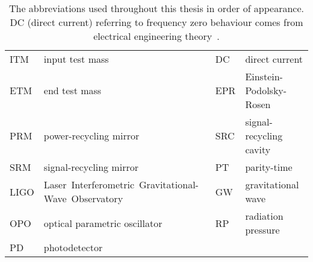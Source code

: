 \begin{table}[]
\centering
\begin{tabular}{@{}ll|ll@{}}
\toprule
ITM & input test mass & DC & direct current \\
ETM & end test mass & EPR & Einstein-Podolsky-Rosen \\
PRM & power-recycling mirror & SRC & signal-recycling cavity \\
SRM & signal-recycling mirror & PT & parity-time \\
LIGO & Laser~Interferometric~Gravitational-Wave~Observatory & GW & gravitational wave \\
OPO & optical parametric oscillator & RP & radiation pressure \\
PD & photodetector &  &  \\ \bottomrule
\end{tabular}
\caption{ The abbreviations used throughout this thesis in order of appearance. DC (direct current) referring to frequency zero behaviour comes from electrical engineering theory~\cite{}.}
\label{tab:abbreviations}
\end{table}




